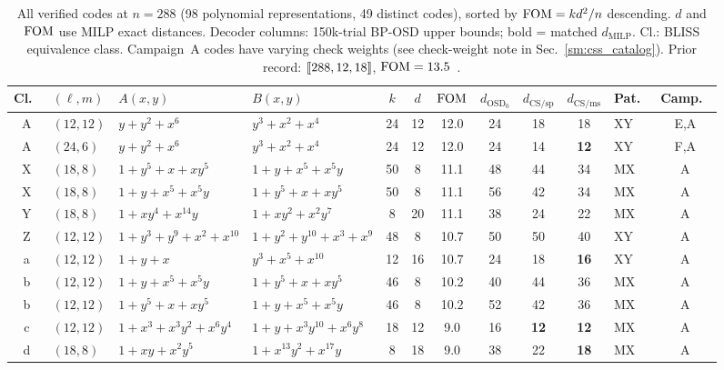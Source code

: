 \begin{table}[t]
\centering
\caption{All verified codes at $n = 288$ (98 polynomial representations, 49 distinct codes), sorted by $\mathrm{FOM} = kd^2/n$ descending.
$d$ and $\mathrm{FOM}$ use MILP exact distances.
Decoder columns: 150k-trial BP-OSD upper bounds; bold = matched $d_{\text{MILP}}$.
Cl.: BLISS equivalence class.
Campaign~A codes have varying check weights (see check-weight note in Sec.~\ref{sm:css_catalog}).
Prior record: $\lbrack\!\lbrack 288,12,18 \rbrack\!\rbrack$, $\mathrm{FOM} = 13.5$~\protect\cite{bravyi2024high}.}
\label{tab:cat288}
\fontsize{4pt}{4.5pt}\selectfont
\renewcommand{\arraystretch}{0.65}
\setlength{\tabcolsep}{0.8pt}
\begin{tabular*}{\textwidth}{@{\extracolsep{\fill}}clllcccccclc}
\toprule
Cl.\ & $(\ell,m)$ & $A(x,y)$ & $B(x,y)$ & $k$ & $d$ & $\mathrm{FOM}$ & $d_{\text{OSD}_0}$ & $d_{\text{CS/sp}}$ & $d_{\text{CS/ms}}$ & Pat.\ & Camp.\ \\
\midrule
A & $(12,12)$ & $y{+}y^{2}{+}x^{6}$ & $y^{3}{+}x^{2}{+}x^{4}$ & 24 & 12 & 12.0 & 24 & 18 & 18 & XY & E,A \\
A & $(24,6)$ & $y{+}y^{2}{+}x^{6}$ & $y^{3}{+}x^{2}{+}x^{4}$ & 24 & 12 & 12.0 & 24 & 14 & \textbf{12} & XY & F,A \\
X & $(18,8)$ & $1{+}y^{5}{+}x{+}xy^{5}$ & $1{+}y{+}x^{5}{+}x^{5}y$ & 50 & 8 & 11.1 & 48 & 44 & 34 & MX & A \\
X & $(18,8)$ & $1{+}y{+}x^{5}{+}x^{5}y$ & $1{+}y^{5}{+}x{+}xy^{5}$ & 50 & 8 & 11.1 & 56 & 42 & 34 & MX & A \\
Y & $(18,8)$ & $1{+}xy^{4}{+}x^{14}y$ & $1{+}xy^{2}{+}x^{2}y^{7}$ & 8 & 20 & 11.1 & 38 & 24 & 22 & MX & A \\
Z & $(12,12)$ & $1{+}y^{3}{+}y^{9}{+}x^{2}{+}x^{10}$ & $1{+}y^{2}{+}y^{10}{+}x^{3}{+}x^{9}$ & 48 & 8 & 10.7 & 50 & 50 & 40 & XY & A \\
a & $(12,12)$ & $1{+}y{+}x$ & $y^{3}{+}x^{5}{+}x^{10}$ & 12 & 16 & 10.7 & 24 & 18 & \textbf{16} & XY & A \\
b & $(12,12)$ & $1{+}y{+}x^{5}{+}x^{5}y$ & $1{+}y^{5}{+}x{+}xy^{5}$ & 46 & 8 & 10.2 & 40 & 44 & 36 & MX & A \\
b & $(12,12)$ & $1{+}y^{5}{+}x{+}xy^{5}$ & $1{+}y{+}x^{5}{+}x^{5}y$ & 46 & 8 & 10.2 & 52 & 42 & 36 & MX & A \\
c & $(12,12)$ & $1{+}x^{3}{+}x^{3}y^{2}{+}x^{6}y^{4}$ & $1{+}y{+}x^{3}y^{10}{+}x^{6}y^{8}$ & 18 & 12 & 9.0 & 16 & \textbf{12} & \textbf{12} & MX & A \\
d & $(18,8)$ & $1{+}xy{+}x^{2}y^{5}$ & $1{+}x^{13}y^{2}{+}x^{17}y$ & 8 & 18 & 9.0 & 38 & 22 & \textbf{18} & MX & A \\

\end{tabular*}
\end{table}
